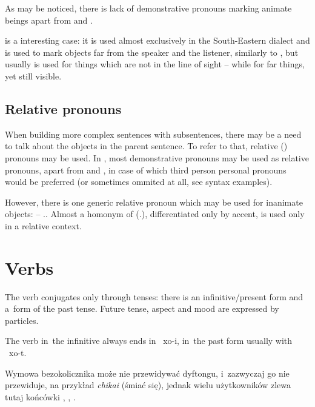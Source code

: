 As may be noticed, there is lack of demonstrative pronouns marking animate
beings apart from  and .

 is a interesting case: it is used almost exclusively in the
South-Eastern dialect and is used to mark objects far from the speaker and the
listener, similarly to , but usually is used for things which are
not in the line of sight -- while  for far things, yet still
visible.

\subsection{Relative pronouns}

When building more complex sentences with subsentences, there may be a need to
talk about the objects in the parent sentence. To refer to that, relative
(\Rel{}) pronouns may be used. In \andro, most demonstrative pronouns may be
used as relative pronouns, apart from  and , in case of
which third person personal pronouns would be preferred (or sometimes ommited at
all, see syntax examples).

However, there is one generic relative pronoun which may be used for inanimate
objects:  -- \Rel{}.\Inan{}. Almost a homonym of 
(\Tpl{}.\Inan{}), differentiated only by accent,  is used only in a
relative context.

\section{Verbs}

The verb conjugates only through tenses: there is an infinitive/present form and
a~form of the past tense. Future tense, aspect and mood are expressed by
particles.

The verb in~the infinitive always ends in ~xo{-i}, in~the past form
usually with ~xo{-t}.



Wymowa bezokolicznika może nie przewidywać dyftongu, i~zazwyczaj go nie
przewiduje, na przykład \emph{chikai}  (śmiać się), jednak wielu
użytkowników zlewa tutaj końcówki , , .

\skipline

